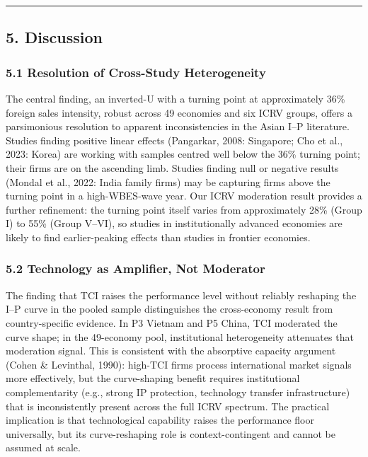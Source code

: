 \documentclass[12pt,a4paper]{article}
\begin{document}
\begin{center}\rule{0.5\linewidth}{0.5pt}\end{center}

\hypertarget{5-discussion}{%
\subsection{5. Discussion}\label{5-discussion}}

\hypertarget{51-resolution-of-cross-study-heterogeneity}{%
\subsubsection{5.1 Resolution of Cross-Study
Heterogeneity}\label{51-resolution-of-cross-study-heterogeneity}}

The central finding, an inverted-U with a turning point at approximately
36\% foreign sales intensity, robust across 49 economies and six ICRV
groups, offers a parsimonious resolution to apparent inconsistencies in
the Asian I--P literature. Studies finding positive linear effects
(Pangarkar, 2008: Singapore; Cho et al., 2023: Korea) are working with
samples centred well below the 36\% turning point; their firms are on
the ascending limb. Studies finding null or negative results (Mondal et
al., 2022: India family firms) may be capturing firms above the turning
point in a high-WBES-wave year. Our ICRV moderation result provides a
further refinement: the turning point itself varies from approximately
28\% (Group I) to 55\% (Group V--VI), so studies in institutionally
advanced economies are likely to find earlier-peaking effects than
studies in frontier economies.

\hypertarget{52-technology-as-amplifier-not-moderator}{%
\subsubsection{5.2 Technology as Amplifier, Not
Moderator}\label{52-technology-as-amplifier-not-moderator}}

The finding that TCI raises the performance level without reliably
reshaping the I--P curve in the pooled sample distinguishes the
cross-economy result from country-specific evidence. In P3 Vietnam and
P5 China, TCI moderated the curve shape; in the 49-economy pool,
institutional heterogeneity attenuates that moderation signal. This is
consistent with the absorptive capacity argument (Cohen \& Levinthal,
1990): high-TCI firms process international market signals more
effectively, but the curve-shaping benefit requires institutional
complementarity (e.g., strong IP protection, technology transfer
infrastructure) that is inconsistently present across the full ICRV
spectrum. The practical implication is that technological capability
raises the performance floor universally, but its curve-reshaping role
is context-contingent and cannot be assumed at scale.
\end{document}

